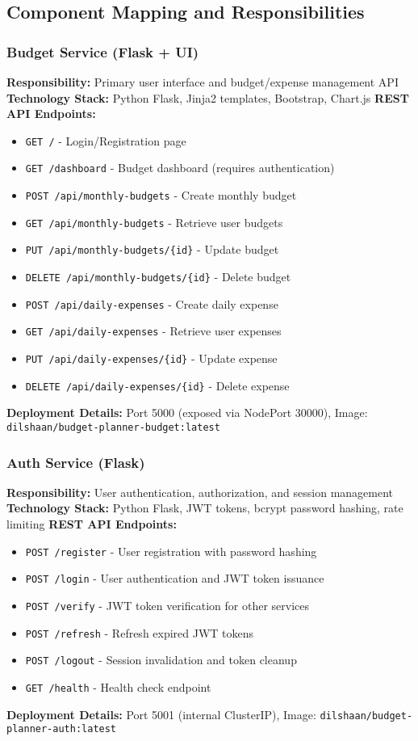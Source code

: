 \documentclass[conference]{IEEEtran}
\begin{document}
\subsection{Component Mapping and Responsibilities}

\subsubsection{Budget Service (Flask + UI)}
\textbf{Responsibility:} Primary user interface and budget/expense management API
\textbf{Technology Stack:} Python Flask, Jinja2 templates, Bootstrap, Chart.js
\textbf{REST API Endpoints:} 
\begin{itemize}
  \item \texttt{GET /} - Login/Registration page
  \item \texttt{GET /dashboard} - Budget dashboard (requires authentication)
  \item \texttt{POST /api/monthly-budgets} - Create monthly budget
  \item \texttt{GET /api/monthly-budgets} - Retrieve user budgets
  \item \texttt{PUT /api/monthly-budgets/\{id\}} - Update budget
  \item \texttt{DELETE /api/monthly-budgets/\{id\}} - Delete budget
  \item \texttt{POST /api/daily-expenses} - Create daily expense
  \item \texttt{GET /api/daily-expenses} - Retrieve user expenses
  \item \texttt{PUT /api/daily-expenses/\{id\}} - Update expense
  \item \texttt{DELETE /api/daily-expenses/\{id\}} - Delete expense
\end{itemize}
\textbf{Deployment Details:} Port 5000 (exposed via NodePort 30000), Image: \texttt{dilshaan/budget-planner-budget:latest}


\subsubsection{Auth Service (Flask)}
\textbf{Responsibility:} User authentication, authorization, and session management
\textbf{Technology Stack:} Python Flask, JWT tokens, bcrypt password hashing, rate limiting
\textbf{REST API Endpoints:}
\begin{itemize}
  \item \texttt{POST /register} - User registration with password hashing
  \item \texttt{POST /login} - User authentication and JWT token issuance
  \item \texttt{POST /verify} - JWT token verification for other services
  \item \texttt{POST /refresh} - Refresh expired JWT tokens
  \item \texttt{POST /logout} - Session invalidation and token cleanup
  \item \texttt{GET /health} - Health check endpoint
\end{itemize}
\textbf{Deployment Details:} Port 5001 (internal ClusterIP), Image: \texttt{dilshaan/budget-planner-auth:latest}
\end{document}
